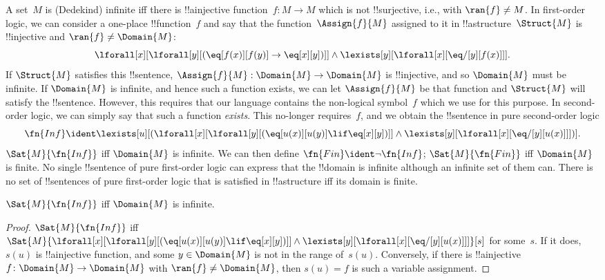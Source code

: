 \documentclass[../../../include/open-logic-section]{subfiles}
\begin{document}


A set~$M$ is (Dedekind) infinite iff there is !!a{injective} function~$f\colon M
\to M$ which is not !!{surjective}, i.e., with $\ran{f} \neq M$. In
first-order logic, we can consider a one-place !!{function}~$f$ and
say that the function~$\Assign{f}{M}$ assigned to it in
!!a{structure}~$\Struct{M}$ is !!{injective} and $\ran{f} \neq
\Domain{M}$:
\[
\lforall[x][\lforall[y][(\eq[f(x)][f(y)] \to \eq[x][y])]] \land
\lexists[y][\lforall[x][\eq/[y][f(x)]]].
\]
If $\Struct{M}$ satisfies this !!{sentence}, $\Assign{f}{M}:
\Domain{M} \to \Domain{M}$ is !!{injective}, and so $\Domain{M}$ must
be infinite. If $\Domain{M}$ is infinite, and hence such a function
exists, we can let $\Assign{f}{M}$ be that function and $\Struct{M}$
will satisfy the !!{sentence}.  However, this requires that our language
contains the non-logical symbol~$f$ which we use for this purpose. In
second-order logic, we can simply say that such a function
\emph{exists}. This no-longer requires~$f$, and we obtain the
!!{sentence} in pure second-order logic
\[
\fn{Inf} \ident \lexists[u][(\lforall[x][\lforall[y][(\eq[u(x)][u(y)]
      \lif \eq[x][y])]] \land \lexists[y][\lforall[x][\eq/[y][u(x)]]])].
\]
$\Sat{M}{\fn{Inf}}$ iff $\Domain{M}$ is infinite.  We can then define
$\fn{Fin} \ident \lnot \fn{Inf}$; $\Sat{M}{\fn{Fin}}$ iff $\Domain{M}$
is finite. No single !!{sentence} of pure first-order logic can
express that the !!{domain} is infinite although an infinite set of
them can. There is no set of !!{sentence}s of pure first-order logic
that is satisfied in !!a{structure} iff its domain is finite.

\begin{prop}
$\Sat{M}{\fn{Inf}}$ iff $\Domain{M}$ is infinite.
\end{prop}

\begin{proof}
$\Sat{M}{\fn{Inf}}$ iff
  $\Sat{M}{\lforall[x][\lforall[y][(\eq[u(x)][u(y)] \lif \eq[x][y])]]
    \land \lexists[y][\lforall[x][\eq/[y][u(x)]]]}[s]$ for
  some~$s$. If it does, $s(u)$ is !!a{injective} function, and some $y
  \in \Domain{M}$ is not in the range of~$s(u)$. Conversely, if there
  is !!a{injective} $f\colon \Domain{M} \to \Domain{M}$ with $\ran{f}
  \neq \Domain{M}$, then $s(u) = f$ is such a variable
  assignment.
\end{proof}
\end{document}

